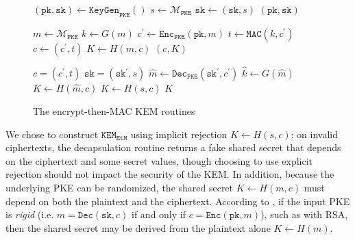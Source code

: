 \documentclass[runningheads]{llncs}
\newcommand{\pke}{\texttt{PKE}}
\newcommand{\keygen}{\texttt{KeyGen}}
\newcommand{\encrypt}{\texttt{Enc}}
\newcommand{\decrypt}{\texttt{Dec}}
\newcommand{\kem}{\texttt{KEM}}
\newcommand{\encap}{\texttt{Encap}}
\newcommand{\decap}{\texttt{Decap}}
\newcommand{\etm}{\texttt{EtM}}  %
\newcommand{\mac}{\texttt{MAC}}
\newcommand{\pk}{\texttt{pk}}
\newcommand{\sk}{\texttt{sk}}
\begin{document}
\begin{figure}[h]
    \centering
    \begin{minipage}[t]{0.32\textwidth}
    \begin{algorithm}[H]
        \caption*{$\keygen_\etm()$}
        \begin{algorithmic}[1]
            \State $(\pk,  \sk) \leftarrow \keygen_\pke()$
            \State $s \leftarrow \mathcal{M}_\pke$
            \State $\sk \leftarrow (\sk, s)$
            \State \Return $(\pk, \sk)$
        \end{algorithmic}
    \end{algorithm}
    \end{minipage}\hfill
    \begin{minipage}[t]{0.3\textwidth}
    \begin{algorithm}[H]
        \caption*{$\encap_\etm(\pk)$}
        \begin{algorithmic}[1]
            \State $m \leftarrow \mathcal{M}_\pke$
            \State $k \leftarrow G(m)$
            \State $c^\prime \leftarrow \encrypt_\pke(\pk, m)$
            \State $t \leftarrow \mac(k, c^\prime)$
            \State $c \leftarrow (c^\prime, t)$
            \State $K \leftarrow H(m, c)$
            \State \Return $(c, K)$
        \end{algorithmic}
    \end{algorithm}
    \end{minipage}\hfill
    \begin{minipage}[t]{0.33\textwidth}
    \begin{algorithm}[H]
        \caption*{$\decap_\etm(\sk, c)$}
        \begin{algorithmic}[1]
            \Require $c = (c^\prime, t)$
            \Require $\sk = (\sk^\prime, s)$
            \State $\hat{m} \leftarrow \decrypt_\pke(\sk^\prime, c^\prime)$
            \State $\hat{k} \leftarrow G(\hat{m})$
            \If{$\mac(\hat{k}, c^\prime) = t$}
                \State $K \leftarrow H(\hat{m}, c)$
            \Else 
                \State $K \leftarrow H(s, c)$
            \EndIf
            \State \Return $K$
        \end{algorithmic}
    \end{algorithm}
    \end{minipage}
    \caption{The encrypt-then-MAC KEM routines}\label{fig:etm-routines}
\end{figure}

We chose to construct $\kem_\etm$ using implicit rejection $K \leftarrow H(s, c)$: on invalid ciphertexts, the decapsulation routine returns a fake shared secret that depends on the ciphertext and some secret values, though choosing to use explicit rejection should not impact the security of the KEM. In addition, because the underlying PKE can be randomized, the shared secret $K \leftarrow H(m, c)$ must depend on both the plaintext and the ciphertext. According to \cite{DBLP:conf/ima/Dent03,DBLP:conf/tcc/HofheinzHK17}, if the input PKE is \textit{rigid} (i.e. $m = \decrypt(\sk, c)$ if and only if $c = \encrypt(\pk, m)$), such as with RSA, then the shared secret may be derived from the plaintext alone $K \leftarrow H(m)$.
\end{document}
